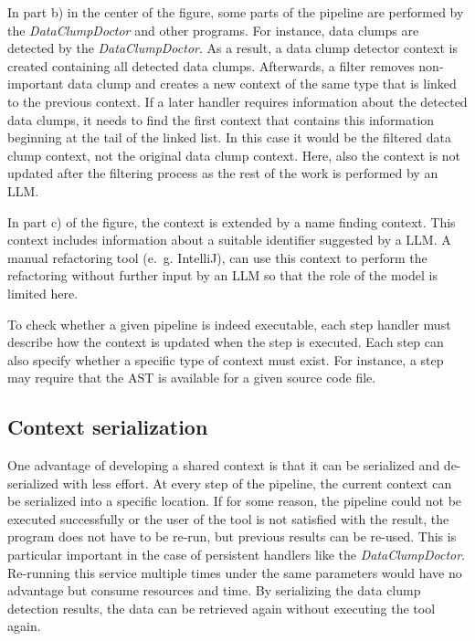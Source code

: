 In part b) in the center of the figure, some parts of the pipeline are performed by the \textit{DataClumpDoctor} and other programs. For instance, data clumps are detected by the \textit{DataClumpDoctor}. As a result, a data clump detector context is created containing all detected data clumps. Afterwards, a filter removes non-important data clump and creates a new context of the same type that is linked to the previous context. If a later handler requires information about the detected data clumps, it needs to find the first context that contains this information  beginning at the tail of the linked list. In this case it would be the filtered data clump context, not the original data clump context. Here, also the context is not updated after the filtering process as the rest of the work is performed by an \ac{LLM}. 

In part c) of the figure, the context is extended by a name finding context. This context includes information about a suitable identifier suggested by a \ac{LLM}. A manual refactoring tool (e.~g. IntelliJ), can use this context to perform the refactoring without further input by an \ac{LLM} so that the role of the model is limited here. 




To check whether a given pipeline is indeed executable, each step handler must describe how the context is updated when the step is executed. Each step can also specify whether a specific type of context must exist. For instance, a step may require that the \ac{AST} is available for a given source code file. 


\subsection{Context serialization}

One advantage of developing a shared context is that it can be serialized  and de-serialized with less effort. At every step of the pipeline, the current context can be  serialized into a specific location. If for some reason, the pipeline could not be executed successfully or the user of the tool is not satisfied with the result, the program does not have to be re-run, but previous results can be re-used. This is particular important in the case of persistent handlers like the \textit{DataClumpDoctor}. Re-running this service multiple times under the same parameters would have no advantage but consume resources and time. By serializing the data clump detection results, the data can be retrieved again without executing the tool again.


